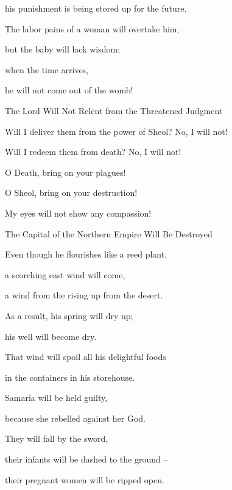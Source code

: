 {\par }{\Q his punishment
is being stored up for the future.
\par }{\Q {}The labor
pains
of a woman will overtake
him,
\par }{\Q but the baby
will lack
wisdom;
\par }{\Q when
the time
arrives,
\par }{\Q he will not
come out
of the womb!
\par }{\SH The Lord Will Not Relent from the Threatened Judgment
\par }{\Q {}Will I deliver
them from the power
of Sheol? No, I will not!

\par }{\Q Will
I redeem
them from death? No, I will
not!
\par }{\Q O Death,
bring on your plagues!

\par }{\Q O Sheol,
bring on your destruction!

\par }{\Q My eyes
will not show
any compassion!
\par }{\SH The Capital of the Northern Empire Will Be Destroyed
\par }{\Q {}Even though
he flourishes
like a reed plant,

\par }{\Q a scorching east wind
will come,
\par }{\Q a wind
from the
{}
rising up
from the desert.
\par }{\Q As a result, his spring
will dry up;
\par }{\Q his well
will become dry.
\par }{\Q That
wind will spoil
all
his delightful
foods
\par }{\Q in the containers
in his storehouse.
\par }{\Q {}Samaria
will be held guilty,
\par }{\Q because
she rebelled
against her God.
\par }{\Q They will fall
by the sword,
\par }{\Q their infants
will be dashed to the ground –
\par }{\Q their pregnant women will be ripped open.

\par }
